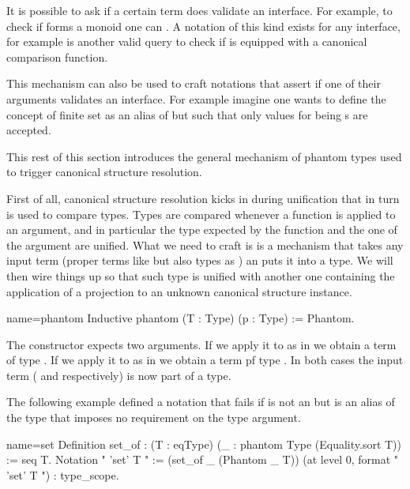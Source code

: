 It is possible to  ask \Coq{} if a certain term does validate an
interface.  For example, to check if  forms a monoid one can
.  A notation of this kind exists for any
interface, for example  is another valid query to
check if  is equipped with a canonical comparison function.

This mechanism can also be used to craft notations that assert
if one of their arguments validates an interface.  For example
imagine one wants to define the concept of finite set as an
alias of  but such that only values for  being
s are accepted.

This rest of this section introduces the general mechanism of phantom
types used to trigger canonical structure resolution.

First of all, canonical structure resolution kicks in during
unification that in turn is used to compare types.  Types are
compared whenever a function is applied to an argument, and in
particular the type expected by the function and the one of the
argument are unified.  What we need to craft is is a mechanism that
takes any input term (proper terms like  but also types as )
an puts it into a type.  We will then wire things up so that such
type is unified with another one containing the application of 
a projection to an unknown canonical structure instance.

\begin{coq}{name=phantom}{}
Inductive phantom (T : Type) (p : Type) := Phantom.
\end{coq}

The  constructor expects two arguments.  If we apply
it to  as in  we obtain a term
of type .  If we apply it to  as
in  we obtain a term
pf type .  In both cases the
input term ( and  respectively) is now part of a type.

The following example defined a notation  that
fails if  is not an  but is an alias of the type
 that imposes no requirement on the type argument. 

\begin{coq}{name=set}{}
Definition set_of : (T : eqType) (_ : phantom Type (Equality.sort T)) := seq T.
Notation "{ 'set' T }" := (set_of _ (Phantom _ T))
  (at level 0, format "{ 'set'  T }") : type_scope.
\end{coq}

